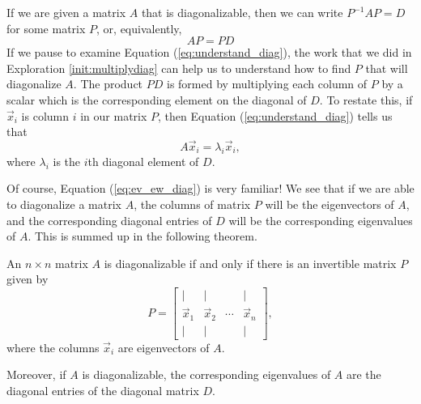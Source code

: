 \documentclass{ximera}
\begin{document}


If we are given a matrix $A$ that is diagonalizable, then we can write $P^{-1}AP=D$ for some matrix $P$, or, equivalently,
\begin{equation}\label{eq:understand_diag}
AP=PD   
\end{equation}
If we pause to examine Equation (\ref{eq:understand_diag}), the work that we did in Exploration  \ref{init:multiplydiag} can help us to understand how to find $P$ that will diagonalize $A$. The product $PD$ is formed by multiplying each column of $P$ by a scalar which is the corresponding element on the diagonal of $D$.  To restate this, if $\vec{x}_i$ is column $i$ in our matrix $P$, then Equation (\ref{eq:understand_diag}) tells us that 
\begin{equation}\label{eq:ev_ew_diag}
A \vec{x}_i = \lambda_i \vec{x}_i,  
\end{equation}
where $\lambda_i$ is the $i$th diagonal element of $D$.  

Of course, Equation (\ref{eq:ev_ew_diag}) is very familiar!  We see that if we are able to diagonalize a matrix $A$, the columns of matrix $P$ will be the eigenvectors of $A$, and the corresponding diagonal entries of $D$ will be the corresponding eigenvalues of $A$.  This is summed up in the following theorem.

\begin{theorem}\label{th:eigenvectorsanddiagonalizable}
An $n\times n$ matrix $A$ is diagonalizable if and only if there is an
invertible matrix $P$ given by
$$P=\begin{bmatrix}
| & | &   & | \\
\vec{x}_1 & \vec{x}_2  & \cdots & \vec{x}_n \\
| & | &   & |
\end{bmatrix},$$
where the columns $\vec{x}_i$ are eigenvectors of $A$.

Moreover, if $A$ is diagonalizable, the corresponding eigenvalues of $A$ are the
diagonal entries of the diagonal matrix $D$.
\end{theorem}
\end{document}
